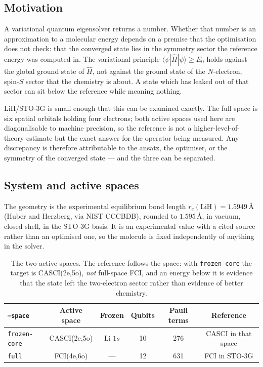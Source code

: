 \documentclass[11pt,a4paper]{article}
\newcommand{\Ang}{\ensuremath{\,\text{\AA}}}
\newcommand{\code}[1]{\texttt{\small #1}}
\begin{document}
\subsection{Motivation}

A variational quantum eigensolver returns a number. Whether that number is an
approximation to a molecular energy depends on a premise that the optimisation
does not check: that the converged state lies in the symmetry sector the
reference energy was computed in. The variational principle
$\langle \psi | \hat H | \psi \rangle \geq E_0$ holds against the global ground
state of $\hat H$, not against the ground state of the $N$-electron, spin-$S$
sector that the chemistry is about. A state which has leaked out of that sector
can sit below the reference while meaning nothing.

LiH/STO-3G is small enough that this can be examined exactly. The full space is
six spatial orbitals holding four electrons; both active spaces used here are
diagonalisable to machine precision, so the reference is not a
higher-level-of-theory estimate but the exact answer for the operator being
measured. Any discrepancy is therefore attributable to the ansatz, the
optimiser, or the symmetry of the converged state --- and the three can be
separated.

\subsection{System and active spaces}

The geometry is the experimental equilibrium bond length
$r_e(\mathrm{LiH}) = 1.5949\Ang$ (Huber and Herzberg, via NIST CCCBDB), rounded
to $1.595\Ang$, in vacuum, closed shell, in the STO-3G basis. It is an
experimental value with a cited source rather than an optimised one, so the
molecule is fixed independently of anything in the solver.

\begin{table}[htbp]
\centering
\caption{The two active spaces. The reference follows the space: with
\code{frozen-core} the target is CASCI(2e,5o), \emph{not} full-space FCI, and an
energy below it is evidence that the state left the two-electron sector rather
than evidence of better chemistry.}
\label{tab:spaces}
\small
\begin{tabular}{lccccc}
\toprule
\code{--space} & Active space & Frozen & Qubits & Pauli terms & Reference \\
\midrule
\code{frozen-core} & CASCI(2e,5o) & Li $1s$ & 10 & 276 & CASCI in that space \\
\code{full}        & FCI(4e,6o)   & ---      & 12 & 631 & FCI in STO-3G \\
\bottomrule
\end{tabular}
\end{table}
\end{document}
